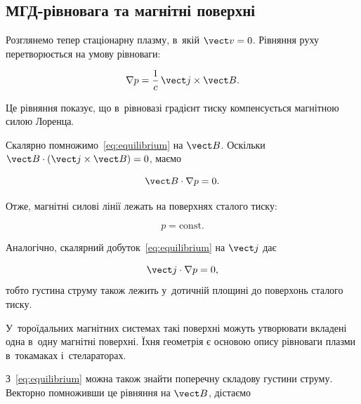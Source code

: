 \subsection{МГД-рівновага та магнітні поверхні}



Розглянемо тепер стаціонарну плазму, в~якій $\vect v=0$. Рівняння руху перетворюється на
умову рівноваги:

\begin{equation}\label{eq:equilibrium}
    \nabla p
    =
    \frac{1}{c}\,\vect j\times\vect B.
\end{equation}

Це рівняння показує, що в~рівновазі градієнт тиску компенсується магнітною силою Лоренца.

Скалярно помножимо~\eqref{eq:equilibrium} на $\vect B$. Оскільки $\vect B\cdot(\vect
j\times\vect B)=0$, маємо

\begin{equation*}
    \vect B\cdot\nabla p=0.
\end{equation*}

Отже, магнітні силові лінії лежать на поверхнях сталого тиску:

\begin{equation*}
    p=\mathrm{const}.
\end{equation*}

Аналогічно, скалярний добуток~\eqref{eq:equilibrium} на $\vect j$ дає

\begin{equation*}
    \vect j\cdot\nabla p=0,
\end{equation*}
%
тобто густина струму також лежить у~дотичній площині до поверхонь сталого тиску.

У~тороїдальних магнітних системах такі поверхні можуть утворювати вкладені одна в~одну
магнітні поверхні. Їхня геометрія є основою опису рівноваги плазми в~токамаках
і~стелараторах.

З~\eqref{eq:equilibrium} можна також знайти поперечну складову густини струму. Векторно
помноживши це рівняння на $\vect B$, дістаємо

